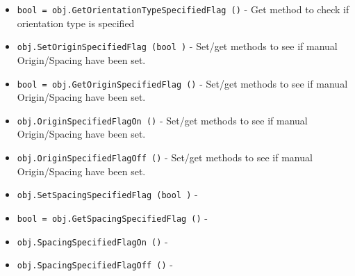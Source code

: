 \begin{itemize}
\item  \verb|bool = obj.GetOrientationTypeSpecifiedFlag ()| -  Get method to check if orientation type is specified

\item  \verb|obj.SetOriginSpecifiedFlag (bool )| -  Set/get methods to see if manual Origin/Spacing have
 been set.

\item  \verb|bool = obj.GetOriginSpecifiedFlag ()| -  Set/get methods to see if manual Origin/Spacing have
 been set.

\item  \verb|obj.OriginSpecifiedFlagOn ()| -  Set/get methods to see if manual Origin/Spacing have
 been set.

\item  \verb|obj.OriginSpecifiedFlagOff ()| -  Set/get methods to see if manual Origin/Spacing have
 been set.

\item  \verb|obj.SetSpacingSpecifiedFlag (bool )| -  

\item  \verb|bool = obj.GetSpacingSpecifiedFlag ()| -  

\item  \verb|obj.SpacingSpecifiedFlagOn ()| -  

\item  \verb|obj.SpacingSpecifiedFlagOff ()| -  

\end{itemize}
